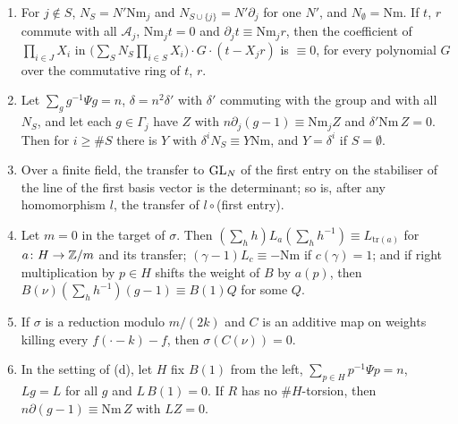 \begin{lemma}\label{lem:norms-logs}
\begin{enumerate}[label=\textup{(\alph*)}]
\item For $j\notin S$, $N_S=N'\mathrm{Nm}_j$ and $N_{S\cup\{j\}}=N'\partial_j$ for one $N'$, and $N_\emptyset=\mathrm{Nm}$. If $t$, $r$ commute with all $\mathcal A_j$, $\mathrm{Nm}_jt=0$ and $\partial_jt\equiv\mathrm{Nm}_jr$, then the coefficient of $\prod_{i\in J}X_i$ in
$\bigl(\sum_SN_S\prod_{i\in S}X_i\bigr)\cdot G\cdot(t-X_jr)$ is $\equiv0$, for every polynomial $G$ over the commutative ring of $t$, $r$.
\item Let $\sum_gg^{-1}\Psi g=n$, $\delta=n^2\delta'$ with $\delta'$ commuting with the group and with all $N_S$, and let each $g\in\Gamma_j$ have $Z$ with $n\partial_j(g-1)\equiv\mathrm{Nm}_jZ$ and $\delta'\mathrm{Nm}\,Z=0$. Then for $i\ge\#S$ there is $Y$ with
$\delta^iN_S\equiv Y\mathrm{Nm}$, and $Y=\delta^i$ if $S=\emptyset$.
\item Over a finite field, the transfer to $\operatorname{GL}_N$ of the first entry on the stabiliser of the line of the first basis vector is the determinant; so is, after any homomorphism $l$, the transfer of $l\circ$(first entry).
\item Let $m=0$ in the target of $\sigma$. Then $(\sum_hh)L_a(\sum_hh^{-1})\equiv L_{\mathrm{tr}(a)}$ for $a\colon H\to\mathbb{Z}/m$ and its transfer; $(\gamma-1)L_c\equiv-\mathrm{Nm}$ if $c(\gamma)=1$; and if right multiplication by $p\in H$ shifts the weight of $B$ by
$a(p)$, then $B(\nu)(\sum_hh^{-1})(g-1)\equiv B(1)Q$ for some $Q$.
\item If $\sigma$ is a reduction modulo $m/(2k)$ and $C$ is an additive map on weights killing every $f(\cdot-k)-f$, then $\sigma(C(\nu))=0$.
\item In the setting of (d), let $H$ fix $B(1)$ from the left, $\sum_{p\in H}p^{-1}\Psi p=n$, $Lg=L$ for all $g$ and $L\,B(1)=0$. If $R$ has no $\#H$-torsion, then $n\partial(g-1)\equiv\mathrm{Nm}\,Z$ with $LZ=0$.
\end{enumerate}
\end{lemma}

